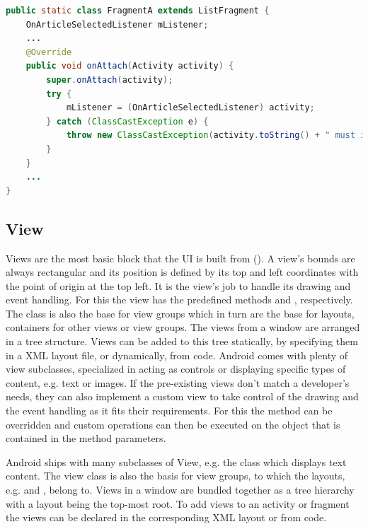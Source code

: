 \vspace*{0.5cm}
\begin{lstlisting}[language=JAVA, caption=Example code for enforcing the implementation of a callback interface, label=lst:callback_interface]
public static class FragmentA extends ListFragment {
    OnArticleSelectedListener mListener;
    ...
    @Override
    public void onAttach(Activity activity) {
        super.onAttach(activity);
        try {
            mListener = (OnArticleSelectedListener) activity;
        } catch (ClassCastException e) {
            throw new ClassCastException(activity.toString() + " must implement OnArticleSelectedListener");
        }
    }
    ...
}
\end{lstlisting}

\subsection{View}
Views are the most basic block that the \gls{UI} is built from (\cite{android_view}). A view's bounds are always rectangular and its position is defined by its top and left coordinates with the point of origin at the top left. It is the view's job to handle its drawing and event handling. For this the view has the predefined methods  and , respectively. The  class is also the base for view groups which in turn are the base for layouts, containers for other views or view groups.
The views from a window are arranged in a tree structure. Views can be added to this tree statically, by specifying them in a \gls{XML} layout file, or dynamically, from code. Android comes with plenty of view subclasses, specialized in acting as controls or displaying specific types of content, e.g. text or images. If the pre-existing views don't match a developer's needs, they can also implement a custom view to take control of the drawing and the event handling as it fits their requirements. For this the  method can be overridden and custom operations can then be executed on the  object that is contained in the method parameters.

Android ships with many subclasses of View, e.g. the  class which displays text content. The view class is also the basis for view groups, to which the layouts, e.g.  and , belong to. Views in a window are bundled together as a tree hierarchy with a layout being the top-most root. To add views to an activity or fragment the views can be declared in the corresponding \gls{XML} layout or from code. 

